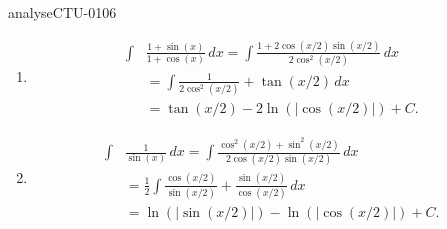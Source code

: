 \begin{corrige}{analyseCTU-0106}
  
  \begin{enumerate}
  \item 
        \begin{equation*}
          \begin{aligned}
            \int &\frac{1+\sin(x)}{1+\cos(x)}\, dx = \int \frac{1 + 2\cos(x/2)\sin(x/2)}{2\cos^2(x/2)}\, dx \\
            &= \int  \frac{1}{2\cos^2(x/2)} + \tan(x/2) \,dx \\
            &= \tan(x/2) - 2\ln(|\cos(x/2)|) +C .
          \end{aligned}
        \end{equation*}
  \item 
    \begin{equation*}
      \begin{aligned}
        \int &\frac{1}{\sin(x)}\, dx = \int \frac{\cos^2(x/2) + \sin^2(x/2)}{2\cos(x/2)\sin(x/2)} \, dx \\
        &= \frac{1}{2}\int \frac{\cos(x/2)}{\sin(x/2)} + \frac{\sin(x/2)}{\cos(x/2)} \, dx\\
        &= \ln(|\sin(x/2)|) -\ln(|\cos(x/2)|) +C.
      \end{aligned}
    \end{equation*}
  \end{enumerate}


\end{corrige}

